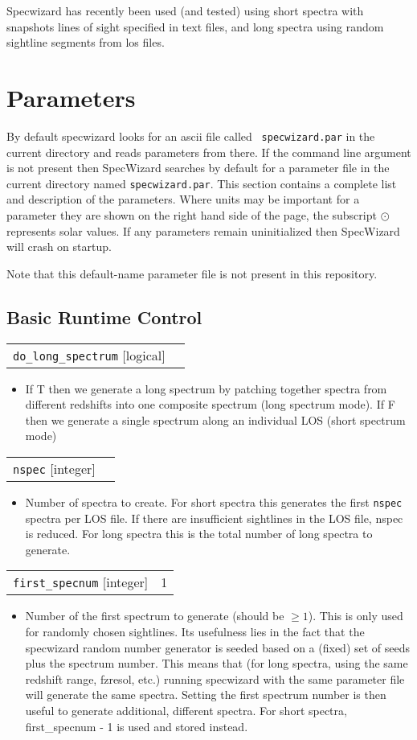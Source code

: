 \documentclass{report}
\makeatletter
\newcommand{\paramdefinition}[3]{
\begin{tabular*}{\textwidth}{l@{\extracolsep{\fill}}r}
		{\tt #1} [{\sc #2}]& #3 \\
\end{tabular*}}
\newcommand{\paramdescription}[1]{
\begin{itemize}
\item #1
\end{itemize}\vspace{0.2cm}}
\makeatother
\begin{document}
Specwizard has recently been used (and tested) using short spectra with snapshots lines of sight specified in text files, and long spectra using random sightline segments from los files. 

\chapter{Parameters}

By default specwizard looks for an ascii file called {\tt
  specwizard.par} in the current directory and reads parameters from
there.  If the command line argument is not present then SpecWizard
searches by default for a parameter file in the current directory
named {\tt specwizard.par}.  This section contains a complete list and
description of the parameters.  Where units may be important for a
parameter they are shown on the right hand side of the page, the
subscript ${\odot}$ represents solar values.  If any parameters remain
uninitialized then SpecWizard will crash on startup.  \linebreak

Note that this default-name parameter file is not present in this repository.

\section{Basic Runtime Control}

\paramdefinition{do\_long\_spectrum}{logical}{}
\paramdescription{If T then we generate a long spectrum by patching together spectra from different redshifts into one composite spectrum (long spectrum mode).  If F then we generate a single spectrum along an individual LOS (short spectrum mode)}

\paramdefinition{nspec}{integer}{}
\paramdescription{Number of spectra to create.  For short spectra this generates the first {\tt nspec} spectra per LOS file. If there are insufficient sightlines in the LOS file, nspec is reduced. For long spectra this is the total number of long spectra to generate.}

\paramdefinition{first\_specnum}{integer}{1}
\paramdescription{Number of the first spectrum to generate (should be $\geq 1$). This is only used for randomly chosen sightlines. Its usefulness lies in the fact that the specwizard random number generator is seeded based on a (fixed) set of seeds plus the spectrum number. This means that (for long spectra, using the same redshift range, fzresol, etc.) running specwizard with the same parameter file will generate the same spectra. Setting the first spectrum number is then useful to generate additional, different spectra. For short spectra, first\_specnum - 1 is used and stored instead.}
\end{document}
